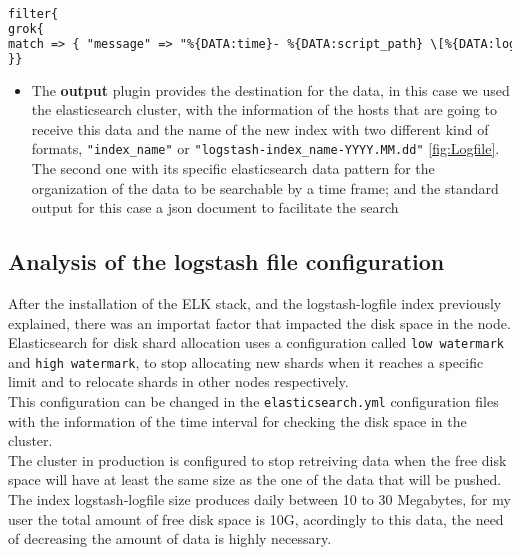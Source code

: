 \begin{lstlisting}[language=xml,frame=tb,caption={input plugin}]
filter{
grok{
match => { "message" => "%{DATA:time}- %{DATA:script_path} \[%{DATA:logger} \(%{DATA:filename}\:%{DATA:function_name}\:%{DATA:line_number}\)] \[%{DATA:level}] %{GREEDYDATA:content}$
}}
\end{lstlisting}

\begin{itemize}
\item The \textbf{output} plugin provides the destination for the data, in this case we used the elasticsearch cluster, with the information of the hosts that are going to receive this data and the name of the new index with two different kind of formats, \texttt{"index\_name"} or \texttt{"logstash-index\_name-YYYY.MM.dd"}  \autoref{fig:Logfile}.
\\

The second one with its specific elasticsearch data pattern for the organization of the data to be searchable by a time frame; and the standard output for this case a json document to facilitate the search
\end{itemize}

\subsection{Analysis of the logstash file configuration} 
After the installation of the ELK stack, and the logstash-logfile index previously explained, there was an importat factor that impacted the disk space in the node.
\\

Elasticsearch for disk shard allocation uses a configuration called \texttt{low watermark} and \texttt{high watermark}, to stop allocating new shards when it reaches a specific limit and to relocate shards in other nodes respectively. 
\\

This configuration can be changed in the \texttt{elasticsearch.yml} configuration files with the information of the time interval for checking the disk space in the cluster.
\\

The cluster in production is configured to stop retreiving data when the free disk space will have at least the same size as the one of the data that will be pushed.
\\

The index logstash-logfile size produces daily between 10 to 30 Megabytes, for my user the total amount of free disk space is 10G, acordingly to this data, the need of decreasing the amount of data is highly necessary.
\\

